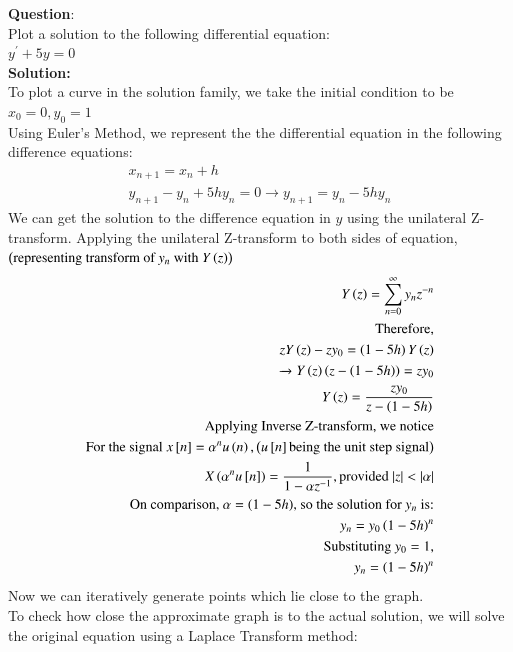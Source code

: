 \documentclass[journal]{IEEEtran}
\begin{document}
\textbf{Question}:\\
Plot a solution to the following differential equation:\\
    $y^\prime + 5y = 0$
\\
\textbf{Solution: }\\
To plot a curve in the solution family, we take the initial condition to be\\
$x_0 = 0, y_0 = 1$\\
Using Euler's Method, we represent the the differential equation in the following difference equations:
\begin{align}
x_{n+1} = x_n + h\\
    y_{n+1} - y_n + 5hy_n  = 0 \xrightarrow{} y_{n+1} = y_n - 5hy_n
\end{align}
We can get the solution to the difference equation in $y$ using the unilateral Z-transform.
Applying the unilateral Z-transform to both sides of equation,$\left(\text{representing transform of $y_n$ with $Y\left(z\right)$}\right)$ 
\begin{align}
    Y\left(z\right) = \sum_{n=0}^{\infty}y_nz^{-n}\\
    \text{Therefore,}\\
    zY\left(z\right) -zy_0 = \left(1-5h\right)Y\left(z\right)\\
    \xrightarrow{} Y\left(z\right)\left(z - \left(1-5h\right)\right) = zy_0\\
    Y\left(z\right) = \frac{zy_0}{z-\left(1-5h\right)}\\
    \text{Applying Inverse Z-transform, we notice}\\
    \text{For the signal $x{}\left[n\right] = \alpha^nu\left(n\right), \left(u{}\left[n\right] \text{being the unit step signal}\right)$}\\
    X\left(\alpha^nu{}\left[n\right]\right) = \frac{1}{1-\alpha z^{-1}}, \text{provided $|z| < |\alpha|$}\\
    \text{On comparison, $\alpha = \left(1-5h\right)$, so the solution for $y_n$ is:}\\
    y_n = y_0\left(1-5h\right)^n\\
    \text{Substituting $y_0 = 1$,}\\
    y_n = \left(1-5h\right)^n\\
\end{align}
Now we can iteratively generate points which lie close to the graph.\\
To check how close the approximate graph is to the actual solution, we will solve the original 
equation using a Laplace Transform method:
\end{document}
